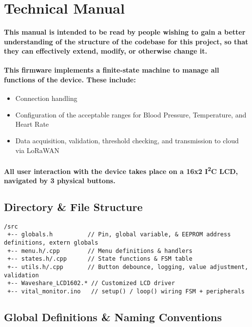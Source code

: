 \newpage
\section*{Technical Manual}
\paragraph{This manual is intended to be read by people wishing to gain a better understanding of the structure of the codebase for this project, so that they can effectively extend, modify, or otherwise change it.}
\paragraph{This firmware implements a finite-state machine to manage all functions of the device. These include:}
\begin{itemize}
	\item Connection handling
	\item Configuration of the acceptable ranges for Blood Pressure, Temperature, and Heart Rate
	\item Data acquisition, validation, threshold checking, and transmission to cloud via LoRaWAN
\end{itemize}
\paragraph{All user interaction with the device takes place on a 16x2 I\textsuperscript{2}C LCD, navigated by 3 physical buttons.}

\subsection{Directory \& File Structure}
\begin{lstlisting}
/src
 +-- globals.h          // Pin, global variable, & EEPROM address definitions, extern globals  
 +-- menu.h/.cpp        // Menu definitions & handlers  
 +-- states.h/.cpp      // State functions & FSM table  
 +-- utils.h/.cpp       // Button debounce, logging, value adjustment, validation  
 +-- Waveshare_LCD1602.* // Customized LCD driver  
 +-- vital_monitor.ino   // setup() / loop() wiring FSM + peripherals  
\end{lstlisting}

\subsection{Global Definitions \& Naming Conventions}
